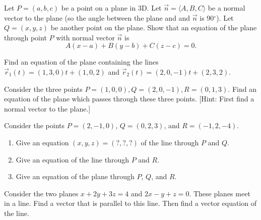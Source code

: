 
\begin{problem}\label{plane equation three points}
%
Let $P=(a,b,c)$ be a point on a plane in 3D. Let $\vec n=\langle A,B,C \rangle $ be a normal vector to the plane (so the angle between the plane and and $\vec n$ is 90$^\circ$).  Let $Q=(x,y,z)$ be another point on the plane.  Show that an equation of the plane through point $P$ with normal vector $\vec n$ is $$A(x-a)+B(y-b)+C(z-c)=0.$$
\end{problem}



\begin{problem}\label{plane equation 2 lines}
%
Find an equation of the plane containing the lines $\vec r_1(t)=(1,3,0)t+(1,0,2)$ and $\vec r_2(t)=(2,0,-1)t+(2,3,2)$.
\end{problem}

\begin{problem}  
%
Consider the three points $P=(1,0,0), Q=(2,0,-1), R=(0,1,3)$. Find an equation of the plane which passes through these three points.  [Hint: First find a normal vector to the plane.]
\end{problem}

\begin{problem}\label{prob:crossproduct normalvector}
 Consider the points $P=(2,-1,0)$, $Q=(0,2,3)$, and $R=(-1,2,-4)$.  
\begin{enumerate}
 \item Give an equation $(x,y,z)=(?,?,?)$ of the line through $P$ and $Q$.
 \item Give an equation of the line through $P$ and $R$.
 \item Give an equation of the plane through $P$, $Q$, and $R$. 
\end{enumerate}
\end{problem}

\begin{problem}  
%
Consider the two planes $x+2y+3z=4$ and $2x-y+z=0$.  These planes meet in a line.  Find a vector that is parallel to this line.  Then find a vector equation of the line.
\end{problem}


